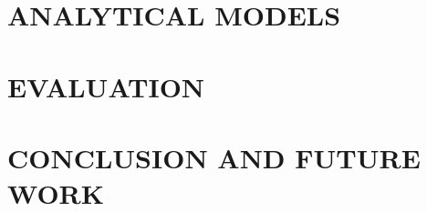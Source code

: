 \documentclass{sig-alternate}
\begin{document}
%

%

\section{\uppercase{Analytical Models}}
\label{sec:analytical}


\section{\uppercase{Evaluation}}
\label{sec:evaluation}


\section{\uppercase{Conclusion and Future Work}}
\label{sec:conclusion}



%

%
%

\end{document}
